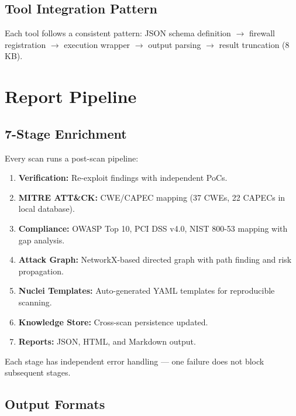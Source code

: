 \documentclass[12pt,a4paper]{report}
\begin{document}
\section{Tool Integration Pattern}

Each tool follows a consistent pattern: JSON schema definition $\rightarrow$ firewall registration $\rightarrow$ execution wrapper $\rightarrow$ output parsing $\rightarrow$ result truncation (8\,KB).


\chapter{Report Pipeline}

\section{7-Stage Enrichment}

Every scan runs a post-scan pipeline:

\begin{enumerate}
    \item \textbf{Verification:} Re-exploit findings with independent PoCs.
    \item \textbf{MITRE ATT\&CK:} CWE/CAPEC mapping (37 CWEs, 22 CAPECs in local database).
    \item \textbf{Compliance:} OWASP Top 10, PCI DSS v4.0, NIST 800-53 mapping with gap analysis.
    \item \textbf{Attack Graph:} NetworkX-based directed graph with path finding and risk propagation.
    \item \textbf{Nuclei Templates:} Auto-generated YAML templates for reproducible scanning.
    \item \textbf{Knowledge Store:} Cross-scan persistence updated.
    \item \textbf{Reports:} JSON, HTML, and Markdown output.
\end{enumerate}

Each stage has independent error handling --- one failure does not block subsequent stages.

\section{Output Formats}
\end{document}
